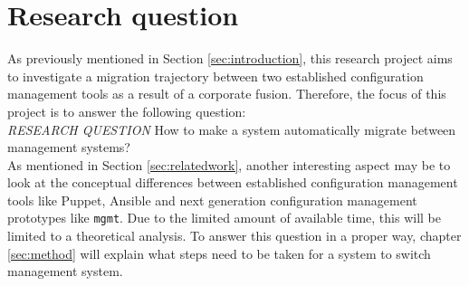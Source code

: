 \section{Research question}\label{sec:researchquestion}
As previously mentioned in Section \ref{sec:introduction}, this research project aims to investigate a migration trajectory between two established configuration management tools as a result of a corporate fusion. Therefore, the focus of this project is to answer the following question:
\\
\textit{RESEARCH QUESTION}
How to make a system automatically migrate between management systems?
\\
As mentioned in Section \ref{sec:relatedwork}, another interesting aspect may be to look at the conceptual differences between established configuration management tools like Puppet, Ansible and next generation configuration management prototypes like \texttt{mgmt}. Due to the limited amount of available time, this will be limited to a theoretical analysis. 
To answer this question in a proper way, chapter \ref{sec:method} will explain what steps need to be taken for a system to switch management system.
